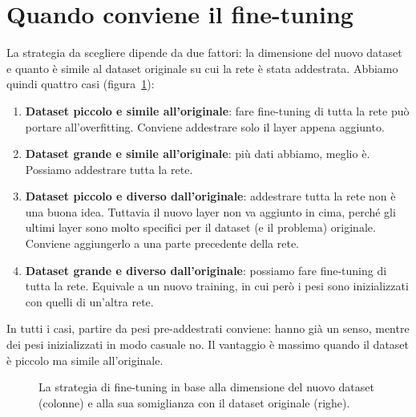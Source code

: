 \section{Quando conviene il fine-tuning}
La strategia da scegliere dipende da due fattori: la dimensione del nuovo dataset e quanto è simile al dataset originale su cui la rete è stata addestrata. Abbiamo quindi quattro casi (figura~\ref{fig:finetuning-casi}):
\begin{enumerate}
    \item \textbf{Dataset piccolo e simile all'originale}: fare fine-tuning di tutta la rete può portare all'overfitting. Conviene addestrare solo il layer appena aggiunto.
    \item \textbf{Dataset grande e simile all'originale}: più dati abbiamo, meglio è. Possiamo addestrare tutta la rete.
    \item \textbf{Dataset piccolo e diverso dall'originale}: addestrare tutta la rete non è una buona idea. Tuttavia il nuovo layer non va aggiunto in cima, perché gli ultimi layer sono molto specifici per il dataset (e il problema) originale. Conviene aggiungerlo a una parte precedente della rete.
    \item \textbf{Dataset grande e diverso dall'originale}: possiamo fare fine-tuning di tutta la rete. Equivale a un nuovo training, in cui però i pesi sono inizializzati con quelli di un'altra rete.
\end{enumerate}
In tutti i casi, partire da pesi pre-addestrati conviene: hanno già un senso, mentre dei pesi inizializzati in modo casuale no. Il vantaggio è massimo quando il dataset è piccolo ma simile all'originale.

\begin{figure}[htbp]
\centering
{}
\caption{La strategia di fine-tuning in base alla dimensione del nuovo dataset (colonne) e alla sua somiglianza con il dataset originale (righe).}
\label{fig:finetuning-casi}
\end{figure}


